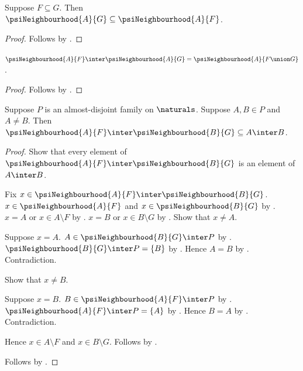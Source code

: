 \begin{proposition}\label{psi_neighbourhood_antitone}
    Suppose $F\subseteq G$.
    Then $\psiNeighbourhood{A}{G}\subseteq
        \psiNeighbourhood{A}{F}$.
\end{proposition}
\begin{proof}
    Follows by
        .
\end{proof}

\begin{proposition}\label{psi_neighbourhood_same_center_intersection}
    $\psiNeighbourhood{A}{F}\inter\psiNeighbourhood{A}{G}
        =\psiNeighbourhood{A}{F\union G}$.
\end{proposition}
\begin{proof}
    Follows by
        .
\end{proof}

\begin{proposition}\label{psi_neighbourhood_distinct_centers_intersection}
    Suppose $P$ is an almost-disjoint family on
        $\naturals$.
    Suppose $A,B\in P$ and $A\neq B$.
    Then $\psiNeighbourhood{A}{F}\inter
        \psiNeighbourhood{B}{G}\subseteq A\inter B$.
\end{proposition}
\begin{proof}
    Show that every element of
        $\psiNeighbourhood{A}{F}\inter\psiNeighbourhood{B}{G}$
        is an element of $A\inter B$.
    \begin{subproof}
        Fix $x\in
            \psiNeighbourhood{A}{F}\inter\psiNeighbourhood{B}{G}$.
        $x\in\psiNeighbourhood{A}{F}$ and
            $x\in\psiNeighbourhood{B}{G}$ by .
        $x=A$ or $x\in A\setminus F$
            by .
        $x=B$ or $x\in B\setminus G$
            by .
        Show that $x\neq A$.
        \begin{subproof}
            Suppose $x=A$.
            $A\in\psiNeighbourhood{B}{G}\inter P$
                by .
            $\psiNeighbourhood{B}{G}\inter P=\{B\}$
                by .
            Hence $A=B$ by .
            Contradiction.
        \end{subproof}
        Show that $x\neq B$.
        \begin{subproof}
            Suppose $x=B$.
            $B\in\psiNeighbourhood{A}{F}\inter P$
                by .
            $\psiNeighbourhood{A}{F}\inter P=\{A\}$
                by .
            Hence $B=A$ by .
            Contradiction.
        \end{subproof}
        Hence $x\in A\setminus F$ and $x\in B\setminus G$.
        Follows by .
    \end{subproof}
    Follows by .
\end{proof}

